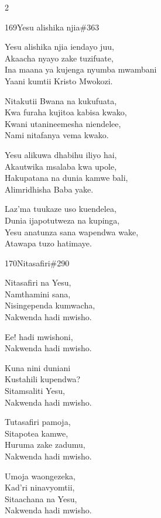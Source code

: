 \begin{multicols}{2}
\begin{hymn}{169}{Yesu alishika njia}{\#363}
\begin{stanza}
Yesu alishika njia iendayo juu,\\
Akaacha nyayo zake tuzifuate,\\
Ina maana ya kujenga nyumba mwambani\\
Yaani kumtii Kristo Mwokozi.
\end{stanza}
\begin{chorus}
Nitakutii Bwana na kukufuata,\\
Kwa furaha kujitoa kabisa kwako,\\
Kwani utanineemesha niendelee,\\
Nami nitafanya vema kwako.
\end{chorus}
\begin{stanza}
Yesu alikuwa dhabihu iliyo hai,\\
Akautwika msalaba kwa upole,\\
Hakupatana na dunia kamwe bali,\\
Alimridhisha Baba yake.
\end{stanza}
\begin{stanza}
Laz'ma tuukaze uso kuendelea,\\
Dunia ijapotutweza na kupinga,\\
Yesu anatunza sana wapendwa wake,\\
Atawapa tuzo hatimaye.
\end{stanza}
\end{hymn}

\begin{hymn}{170}{Nitasafiri}{\#290}
\begin{stanza}
Nitasafiri na Yesu,\\
Namthamini sana,\\
Nisingependa kumwacha,\\
Nakwenda hadi mwisho.
\end{stanza}
\begin{chorus}
Ee! hadi mwishoni,\\
Nakwenda hadi mwisho.
\end{chorus}
\begin{stanza}
Kuna nini duniani\\
Kustahili kupendwa?\\
Sitamsaliti Yesu,\\
Nakwenda hadi mwisho.
\end{stanza}
\begin{stanza}
Tutasafiri pamoja,\\
Sitapotea kamwe,\\
Huruma zake zadumu,\\
Nakwenda hadi mwisho.
\end{stanza}
\begin{stanza}
Umoja waongezeka,\\
Kad'ri ninavyomtii,\\
Sitaachana na Yesu,\\
Nakwenda hadi mwisho.
\end{stanza}
\end{hymn}


\end{multicols}
